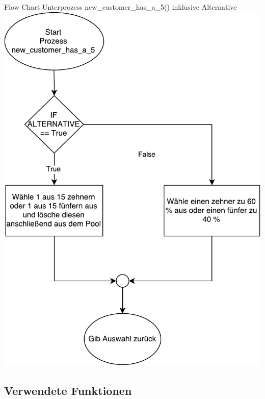 \begin{frame}{Flow Chart Unterprozess new\_customer\_has\_a\_5() inklusive Alternative}
	\centering
  	\includegraphics[scale=0.3]{BSP18_Flow_Chart_3.pdf}
\end{frame}


\subsection{Verwendete Funktionen}
%
%





